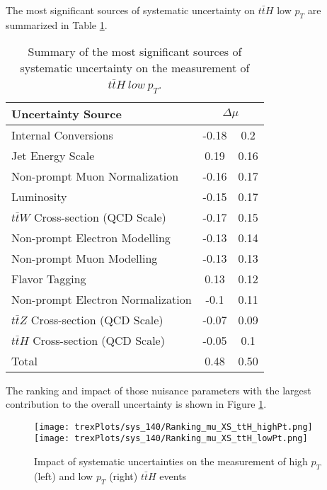 The most significant sources of systematic uncertainty on $t\bar{t}H$ low $p_T$ are summarized in Table \ref{tab:systematics_low_140}.

\begin{table}[H]
    \centering
    \begin{tabular}{l|cc}
        \hline\hline
        Uncertainty Source & \multicolumn{2}{c}{$\Delta \mu$ }  \\
        \hline
        Internal Conversions & -0.18 & 0.2 \\
        Jet Energy Scale & 0.19 & 0.16 \\
        Non-prompt Muon Normalization & -0.16 & 0.17 \\
        Luminosity & -0.15 & 0.17 \\
        $t\bar{t}W$ Cross-section (QCD Scale) & -0.17 & 0.15 \\
        Non-prompt Electron Modelling & -0.13 & 0.14 \\
        Non-prompt Muon Modelling & -0.13 & 0.13 \\
        Flavor Tagging & 0.13 & 0.12 \\
        Non-prompt Electron Normalization & -0.1 & 0.11 \\
        $t\bar{t}Z$ Cross-section (QCD Scale) & -0.07 & 0.09 \\
        $t\bar{t}H$ Cross-section (QCD Scale) & -0.05 & 0.1 \\
        \hline
        Total & 0.48 & 0.50 \\
        \hline\hline
    \end{tabular}
    \caption{Summary of the most significant sources of systematic uncertainty on the measurement of $t\bar{t}H\ low\ p_T$.}
    \label{tab:systematics_low_140}
\end{table}

The ranking and impact of those nuisance parameters with the largest contribution to the overall uncertainty is shown in Figure \ref{fig:ranking_140}.
                                                                                                                             
\begin{figure}[H]
    \centering                                                                                                               
    \texttt{[image: trexPlots/sys\_140/Ranking\_mu\_XS\_ttH\_highPt.png]}%
    \texttt{[image: trexPlots/sys\_140/Ranking\_mu\_XS\_ttH\_lowPt.png]}
    \caption{Impact of systematic uncertainties on the measurement of high $p_T$ (left) and low $p_T$ (right) $t\bar{t}H$ events}
    \label{fig:ranking_140}
\end{figure}

